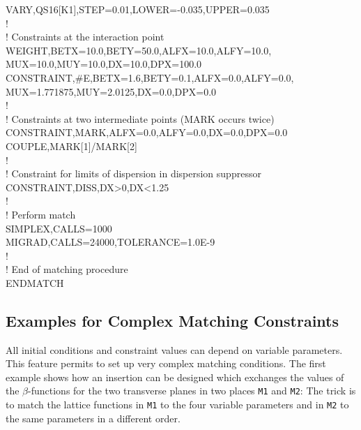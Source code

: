 {   \>VARY,QS16[K1],STEP=0.01,LOWER=-0.035,UPPER=0.035 \\
! \\
! Constraints at the interaction point \\
   \>WEIGHT,BETX=10.0,BETY=50.0,ALFX=10.0,ALFY=10.0, \\
   \>MUX=10.0,MUY=10.0,DX=10.0,DPX=100.0 \\
   \>CONSTRAINT,\#E,BETX=1.6,BETY=0.1,ALFX=0.0,ALFY=0.0, \\
   \>MUX=1.771875,MUY=2.0125,DX=0.0,DPX=0.0 \\
! \\
! Constraints at two intermediate points (MARK occurs twice) \\
   \>CONSTRAINT,MARK,ALFX=0.0,ALFY=0.0,DX=0.0,DPX=0.0 \\
   \>COUPLE,MARK[1]/MARK[2] \\
! \\
! Constraint for limits of dispersion in dispersion suppressor \\
   \>CONSTRAINT,DISS,DX>0,DX<1.25 \\
! \\
! Perform match \\
   \>SIMPLEX,CALLS=1000 \\
   \>MIGRAD,CALLS=24000,TOLERANCE=1.0E-9 \\
! \\
! End of matching procedure \\
ENDMATCH
}
 
\subsection{Examples for Complex Matching Constraints}
All initial conditions and constraint values can depend on variable
parameters.
This feature permits to set up very complex matching conditions.
The first example shows how an insertion can be designed which exchanges
the values of the \(\beta\)-functions for the two transverse planes
in two places {\tt M1} and {\tt M2}:
The trick is to match the lattice functions in {\tt M1} to the four
variable parameters
and in {\tt M2} to the same parameters in a different order.
 
